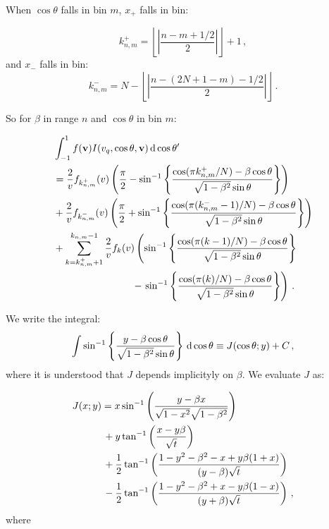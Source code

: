 
When $\cos\theta$ falls in bin $m$, $x_+$ falls in bin:

\begin{equation}
k^{+}_{n,m} = \left \lfloor{\left|\frac{n-m+1/2}{2}\right|}\right \rfloor + 1\,,
\end{equation}
and $x_-$ falls in bin:
\begin{equation}
k^{-}_{n,m} = N - \left \lfloor{\left|\frac{n-(2N+1 -m)-1/2}{2}\right|}\right \rfloor\,.
\end{equation}

So for $\beta$ in range $n$ and $\cos\theta$ in bin $m$:

\begin{align*}
& \int_{-1}^{1} f(\textbf{v}) I(v_q, \cos\theta, \textbf{v}) \, \mathrm{d}\cos\theta'\\
&= \frac{2}{v} f_{k_{n,m}^+}(v) \left( \frac{\pi}{2} - \sin^{-1}\left\{\frac{\cos(\pi k_{n,m}^{+}/N) - \beta \cos\theta}{\sqrt{1-\beta^2}\sin\theta}\right\}\right)\\
&+ \frac{2}{v} f_{k_{n,m}^-}(v) \left( \frac{\pi}{2} + \sin^{-1}\left\{\frac{\cos(\pi (k_{n,m}^{-}-1)/N) - \beta \cos\theta}{\sqrt{1-\beta^2}\sin\theta}\right\}\right)\\
&+ \sum_{k = k_{n,m}^+ +1}^{k_{n,m}-1} \frac{2}{v} f_{k}(v) \left( \sin^{-1}\left\{\frac{\cos(\pi (k-1)/N) - \beta \cos\theta}{\sqrt{1-\beta^2}\sin\theta}\right\}\right. \\
&\qquad\qquad\qquad\qquad- \left.\sin^{-1}\left\{\frac{\cos(\pi (k)/N) - \beta \cos\theta}{\sqrt{1-\beta^2}\sin\theta}\right\}\right)\,.
\end{align*}

We write the integral:
\begin{equation}
\int \sin^{-1}\left\{\frac{y - \beta \cos\theta}{\sqrt{1-\beta^2}\sin\theta}\right\} \, \mathrm{d}\cos\theta \equiv J(\cos\theta; y) + C\,,
\end{equation}
where it is understood that $J$ depends implicityly on $\beta$. We evaluate $J$ as:

\begin{align*}
J(x;y) &= x \sin^{-1}\left(\frac{y-\beta x}{\sqrt{1-x^2}\sqrt{1-\beta^2}}\right) \\
&\, + y \tan^{-1}\left(\frac{x-y\beta}{\sqrt{t}}\right) \\
&\, + \frac{1}{2} \tan^{-1}\left(\frac{1 - y^2 - \beta^2 - x + y\beta(1+x)}{(y-\beta) \sqrt{t}}\right) \\
&\, - \frac{1}{2} \tan^{-1}\left(\frac{1 - y^2 - \beta^2 + x - y\beta(1-x)}{(y+\beta) \sqrt{t}}\right)\,,
\end{align*}
where

